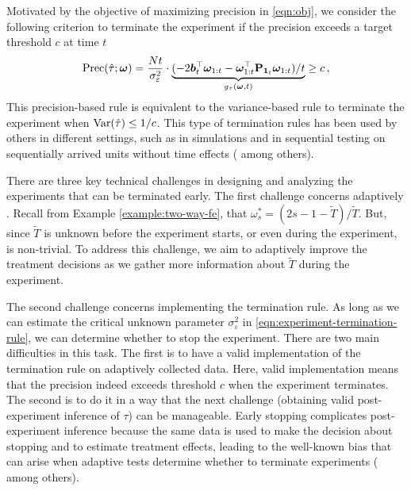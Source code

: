 Motivated by the objective of maximizing precision in \eqref{eqn:obj}, we consider the following criterion to terminate the experiment if the precision exceeds a target threshold $c$ at time $t$
\begin{equation}\label{eqn:experiment-termination-rule}
    {\textcolor{black}{\mathrm{Prec}(\hat{\tau}; \bm{\omega}) = \frac{Nt}{\sigma_\varepsilon^2} \cdot \underbrace{(- 2 \bm{b}_t^\top\bm{\omega}_{1:t} -\bm{\omega}_{1:t}^\top\mathbf{P}_{\bm{1}_{t}} \bm{\omega}_{1:t})/t}_{ g_{\tau}(\bm{\omega}, t)}  \geq c\,,}}
\end{equation}
This precision-based rule is equivalent to the variance-based rule to terminate the experiment when $\mathrm{Var}(\hat{\tau}) \leq 1/c$. This type of termination rules has been used by others in different settings, such as in simulations and in sequential testing on sequentially arrived units without time effects (\cite{chow1965asymptotic,glynn1992asymptotic,singham2012finite} among others). 

There are three key technical challenges in designing and analyzing the experiments that can be terminated early. 
%
The first challenge concerns adaptively . 
Recall from Example \ref{example:two-way-fe}, that $\omega_s^\ast =(2s-1-\tilde{T})/\tilde{T}$. But, since $\tilde{T}$ is unknown before the experiment starts, or even during the experiment,  is non-trivial. To address this challenge, we aim to adaptively improve the treatment decisions as we gather more information about $\tilde{T}$ during the experiment. 

The second challenge concerns implementing the termination rule. As long as we can estimate the critical unknown parameter $\sigma_\varepsilon^2$ in \eqref{eqn:experiment-termination-rule}, we can determine whether to stop the experiment. There are two main difficulties in this task. The first is to have a valid implementation of the termination rule on adaptively collected data. Here, valid implementation means that the precision indeed exceeds threshold $c$ when the experiment terminates. The second is to do it in a way that the next challenge (obtaining valid post-experiment inference of $\tau$) can be manageable. 
Early stopping complicates post-experiment inference because the same data is used to make the decision about stopping and to estimate treatment effects, leading to the well-known bias that can arise when adaptive tests determine whether to terminate experiments (\cite{johari2017peeking} among others).


